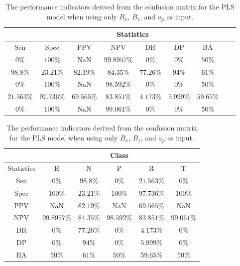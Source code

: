 \begin{table}[!ht]
	\centering
	\begin{tabular}{|c|c|c|c|c|c|c|c|c|}
		\hline
		 & \multicolumn{7}{c|}{Statistics} \\ \hline
		Sen & Spec & PPV & NPV & DR & DP & BA \\ \hline
		$0\%$ & $100\%$ & NaN & $99.8957\%$ & $0\%$ & $0\%$ & $50\%$ \\ \hline
		$98.8\%$ & $23.21\%$ & $82.19\%$ & $84.35\%$ & $77.26\%$ & $94\%$ & $61\%$ \\ \hline
		$0\%$ & $100\%$ & NaN & $98.592\%$ & $0\%$ & $0\%$ & $50\%$ \\ \hline
		$21.563\%$ & $97.736\%$ & $69.565\%$ & $83.851\%$ & $4.173\%$ & $5.999\%$ & $59.65\%$ \\ \hline
		$0\%$ & $100\%$ & NaN & $99.061\%$ & $0\%$ & $0\%$ & $50\%$ \\ \hline
	\end{tabular}
	\caption{The performance indicators derived from the confusion matrix for the PLS model when using only $B_{x}$, $B_{z}$, and $a_{p}$ as input.}
	\label{tab:cs:xzap:pls}
\end{table}

\begin{table}[!ht]
	\centering
	\begin{tabular}{|c|c|c|c|c|c|}
		\hline
		 & \multicolumn{5}{c|}{Class} \\ \hline
		Statistics & E & N & P & R & T \\ \hline
		Sen & $0\%$ & $98.8\%$ & $0\%$ & $21.563\%$ & $0\%$ \\ \hline
		Spec & $100\%$ & $23.21\%$ & $100\%$ & $97.736\%$ & $100\%$ \\ \hline
		PPV & NaN & $82.19\%$ & NaN & $69.565\%$ & NaN \\ \hline
		NPV & $99.8957\%$ & $84.35\%$ & $98.592\%$ & $83.851\%$ & $99.061\%$ \\ \hline
		DR & $0\%$ & $77.26\%$ & $0\%$ & $4.173\%$ & $0\%$ \\ \hline
		DP & $0\%$ & $94\%$ & $0\%$ & $5.999\%$ & $0\%$ \\ \hline
		BA & $50\%$ & $61\%$ & $50\%$ & $59.65\%$ & $50\%$ \\ \hline
	\end{tabular}
	\caption{The performance indicators derived from the confusion matrix for the PLS model when using only $B_{x}$, $B_{z}$, and $a_{p}$ as input.}
	\label{tab:cs:reverse:xzap:pls}
\end{table}

